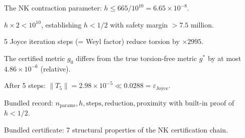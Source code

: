 \begin{definition}[NK Bounds]\label{def:nk_bounds}
    \leanok
    The NK contraction parameter: $h \leq 665 / 10^{10} = 6.65 \times 10^{-8}$.
\end{definition}

\begin{theorem}[$h < 1/2$ (Unconditional)]\label{thm:nk_contraction}
    \leanok
    $h \times 2 < 10^{10}$, establishing $h < 1/2$ with safety margin $> 7.5$ million.
\end{theorem}

\begin{theorem}\label{thm:joyce_5_steps}
    \leanok
    5 Joyce iteration steps (= Weyl factor) reduce torsion by $\times 2995$.
\end{theorem}

\begin{theorem}\label{thm:proximity}
    \leanok
    The certified metric $g_0$ differs from the true torsion-free metric $g^*$
    by at most $4.86 \times 10^{-6}$ (relative).
\end{theorem}

\begin{theorem}\label{thm:final_below_joyce}
    \leanok
    After 5 steps: $\|T_5\| = 2.98 \times 10^{-5} \ll 0.0288 = \varepsilon_{\text{Joyce}}$.
\end{theorem}

\begin{definition}\label{def:nk_certificate}
    \leanok
    Bundled record: $n_{\text{params}}, h, \text{steps}, \text{reduction}, \text{proximity}$
    with built-in proof of $h < 1/2$.
\end{definition}

\begin{theorem}\label{thm:nk_cert}
    \leanok
    Bundled certificate: 7 structural properties of the NK certification chain.
\end{theorem}

